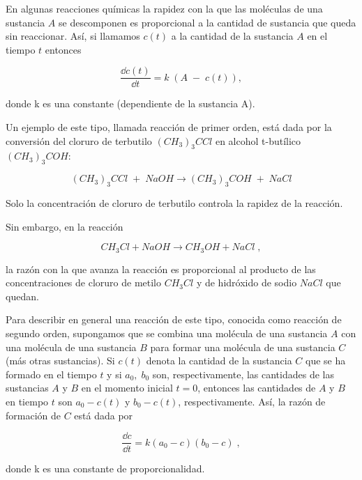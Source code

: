 En algunas reacciones químicas la rapidez con la que las moléculas de una sustancia $A$ se descomponen es proporcional a la cantidad de sustancia que queda sin reaccionar. Así, si llamamos $c(t)$ a la cantidad de la sustancia $A$ en el tiempo $t$ entonces 
  
 \begin{equation*}
 	\dfrac {\dd c(t)}{\dd t}= k\;( A\;- \; c(t)) ,
 \end{equation*} 
    
donde k es una constante (dependiente de la sustancia A).
  
   
Un ejemplo de este tipo, llamada reacción de primer orden, está dada por la conversión del cloruro de terbutilo $(CH_3)_3CCl$ en alcohol t-butílico $(CH_3)_3COH$: 
   
\begin{equation*}
	(CH_3)_3CCl \; + \; NaOH \longrightarrow (CH_3)_3COH\; + \; NaCl
\end{equation*}
   
   Solo la concentración de cloruro de terbutilo controla la rapidez de la reacción. 
   
   Sin embargo, en la reacción 
   
   \begin{equation*}
   	CH_3Cl + NaOH \longrightarrow  CH_3OH + NaCl \; ,
   \end{equation*}
   
la razón con la que avanza la reacción es proporcional al producto de las concentraciones de cloruro de metilo $CH_3Cl$ y de hidróxido de sodio $NaCl$ que quedan. 
   
   Para describir en general una reacción de este tipo, conocida como reacción de segundo orden, supongamos que se combina una molécula de una sustancia $A$ con una molécula de una sustancia $B$ para formar una molécula de una sustancia $C$ (más otras sustancias). Si $c(t)$ denota la cantidad de la sustancia $C$ que se ha formado en el tiempo $t$ y si $a_0,\; b_0$ son, respectivamente, las cantidades de las sustancias $A$ y $B$ en el momento inicial $t = 0$, entonces las cantidades de $A$ y $B$ en tiempo $t$ son $a_0- c(t)$ y $b_0- c(t)$, respectivamente. Así, la razón de formación de $C$ está dada por 
   
\begin{equation*}
	\frac {\dd c}{\dd t}=k(a_0-c)(b_0-c)\; ,
\end{equation*} 
   
donde k es una constante de proporcionalidad. 


